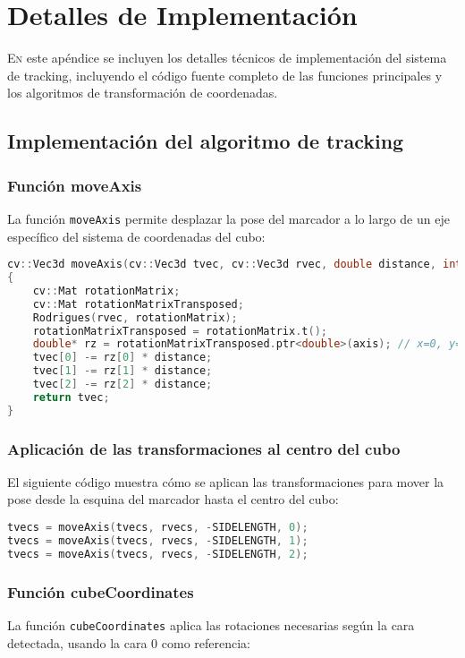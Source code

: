 \chapter{Detalles de Implementación}
\label{chap:detalles_implementacion}

\lettrine{E}{n} este apéndice se incluyen los detalles técnicos de implementación del sistema de tracking, incluyendo el código fuente completo de las funciones principales y los algoritmos de transformación de coordenadas.

\section{Implementación del algoritmo de tracking}

\subsection{Función moveAxis}
La función \texttt{moveAxis} permite desplazar la pose del marcador a lo largo de un eje específico del sistema de coordenadas del cubo:

\begin{lstlisting}[language=C++]
cv::Vec3d moveAxis(cv::Vec3d tvec, cv::Vec3d rvec, double distance, int axis)
{
    cv::Mat rotationMatrix;
    cv::Mat rotationMatrixTransposed;
    Rodrigues(rvec, rotationMatrix);
    rotationMatrixTransposed = rotationMatrix.t();
    double* rz = rotationMatrixTransposed.ptr<double>(axis); // x=0, y=1, z=2
    tvec[0] -= rz[0] * distance;
    tvec[1] -= rz[1] * distance;
    tvec[2] -= rz[2] * distance;
    return tvec;
}
\end{lstlisting}

\subsection{Aplicación de las transformaciones al centro del cubo}
El siguiente código muestra cómo se aplican las transformaciones para mover la pose desde la esquina del marcador hasta el centro del cubo:

\begin{lstlisting}[language=C++]
tvecs = moveAxis(tvecs, rvecs, -SIDELENGTH, 0);
tvecs = moveAxis(tvecs, rvecs, -SIDELENGTH, 1);
tvecs = moveAxis(tvecs, rvecs, -SIDELENGTH, 2);
\end{lstlisting}

\subsection{Función cubeCoordinates}
La función \texttt{cubeCoordinates} aplica las rotaciones necesarias según la cara detectada, usando la cara 0 como referencia:


